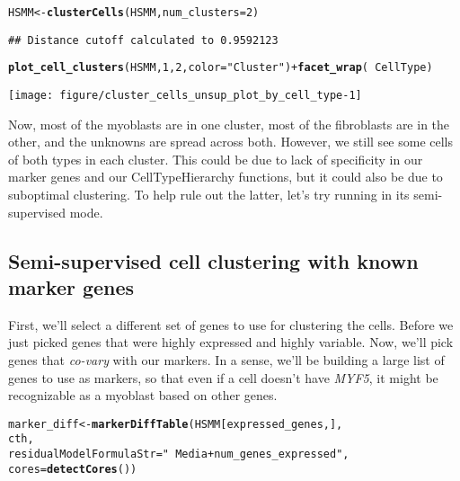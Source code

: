\documentclass[10pt,oneside]{article}\usepackage[]{graphicx}\usepackage[]{color}
\makeatletter
\def\maxwidth{ %
  \ifdim\Gin@nat@width>\linewidth
    \linewidth
  \else
    \Gin@nat@width
  \fi
}
\newcommand{\hlnum}[1]{\textcolor[rgb]{0.686,0.059,0.569}{#1}}%
\newcommand{\hlstr}[1]{\textcolor[rgb]{0.192,0.494,0.8}{#1}}%
\newcommand{\hlopt}[1]{\textcolor[rgb]{0,0,0}{#1}}%
\newcommand{\hlstd}[1]{\textcolor[rgb]{0.345,0.345,0.345}{#1}}%
\newcommand{\hlkwb}[1]{\textcolor[rgb]{0.69,0.353,0.396}{#1}}%
\newcommand{\hlkwc}[1]{\textcolor[rgb]{0.333,0.667,0.333}{#1}}%
\newcommand{\hlkwd}[1]{\textcolor[rgb]{0.737,0.353,0.396}{\textbf{#1}}}%
\newenvironment{kframe}{%
 \def\at@end@of@kframe{}%
 \ifinner\ifhmode%
  \def\at@end@of@kframe{\end{minipage}}%
  \begin{minipage}{\columnwidth}%
 \fi\fi%
 \def\FrameCommand##1{\hskip\@totalleftmargin \hskip-\fboxsep
 \colorbox{shadecolor}{##1}\hskip-\fboxsep
     \hskip-\linewidth \hskip-\@totalleftmargin \hskip\columnwidth}%
 \MakeFramed {\advance\hsize-\width
   \@totalleftmargin\z@ \linewidth\hsize
   \@setminipage}}%
 {\par\unskip\endMakeFramed%
 \at@end@of@kframe}
\newenvironment{knitrout}{}{} %
\makeatother
\begin{document}
\begin{knitrout}
\color{fgcolor}\begin{kframe}
\begin{alltt}
\hlstd{HSMM} \hlkwb{<-} \hlkwd{clusterCells}\hlstd{(HSMM,} \hlkwc{num_clusters}\hlstd{=}\hlnum{2}\hlstd{)}
\end{alltt}
\begin{verbatim}
## Distance cutoff calculated to 0.9592123
\end{verbatim}


{\ttfamily\noindent\itshape\color{messagecolor}{\#\# the length of the distance: 34191}}\begin{alltt}
\hlkwd{plot_cell_clusters}\hlstd{(HSMM,} \hlnum{1}\hlstd{,} \hlnum{2}\hlstd{,} \hlkwc{color}\hlstd{=}\hlstr{"Cluster"}\hlstd{)} \hlopt{+} \hlkwd{facet_wrap}\hlstd{(}\hlopt{~}\hlstd{CellType)}
\end{alltt}
\end{kframe}

{\centering \texttt{[image: figure/cluster\_cells\_unsup\_plot\_by\_cell\_type-1]} 

}



\end{knitrout}
 
Now, most of the myoblasts are in one cluster, most of the fibroblasts are in the other, and the unknowns are spread across both. However, we still see some cells of both types in each cluster. This could be due to lack of specificity in our marker genes and our CellTypeHierarchy functions, but it could also be due to suboptimal clustering. To help rule out the latter, let's try running  in its semi-supervised mode.  
  
\subsection{Semi-supervised cell clustering with known marker genes}
  
First, we'll select a different set of genes to use for clustering the cells. Before we just picked genes that were highly expressed and highly variable. Now, we'll pick genes that \emph{co-vary} with our markers. In a sense, we'll be building a large list of genes to use as markers, so that even if a cell doesn't have \emph{MYF5}, it might be recognizable as a myoblast based on other genes.
  
\begin{knitrout}
\color{fgcolor}\begin{kframe}
\begin{alltt}
\hlstd{marker_diff} \hlkwb{<-} \hlkwd{markerDiffTable}\hlstd{(HSMM[expressed_genes,],}
                                 \hlstd{cth,}
                                 \hlkwc{residualModelFormulaStr}\hlstd{=}\hlstr{"~Media + num_genes_expressed"}\hlstd{,}
                                 \hlkwc{cores}\hlstd{=}\hlkwd{detectCores}\hlstd{())}
\end{alltt}
\end{kframe}
\end{knitrout}
\end{document}
